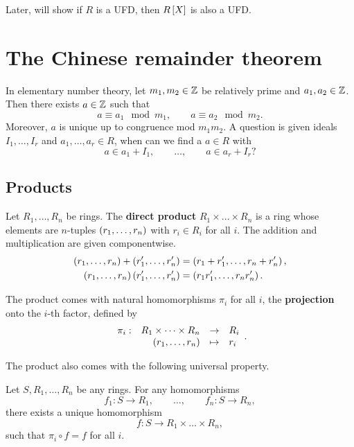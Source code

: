 Later, will show if $ R $ is a UFD, then $ R\sb{X} $ is also a UFD.

\pagebreak

\section{The Chinese remainder theorem}

In elementary number theory, let $ m_1, m_2 \in \Z $ be relatively prime and $ a_1, a_2 \in \Z $. Then there exists $ a \in \Z $ such that
$$ a \equiv a_1 \mod m_1, \qquad a \equiv a_2 \mod m_2. $$
Moreover, $ a $ is unique up to congruence mod $ m_1m_2 $. A question is given ideals $ I_1, \dots, I_r $ and $ a_1, \dots, a_r \in R $, when can we find a $ a \in R $ with
$$ a \in a_1 + I_1, \qquad \dots, \qquad a \in a_r + I_r? $$

\subsection{Products}

\begin{definition}
Let $ R_1, \dots, R_n $ be rings. The \textbf{direct product} $ R_1 \times \dots \times R_n $ is a ring whose elements are $ n $-tuples $ \rb{r_1, \dots, r_n} $ with $ r_i \in R_i $ for all $ i $. The addition and multiplication are given componentwise.
\begin{align*}
\rb{r_1, \dots, r_n} + \rb{r_1', \dots, r_n'} & = \rb{r_1 + r_1', \dots, r_n + r_n'}, \\
\rb{r_1, \dots, r_n}\rb{r_1', \dots, r_n'} & = \rb{r_1r_1', \dots, r_nr_n'}.
\end{align*}
\end{definition}

\begin{note*}
The product comes with natural homomorphisms $ \pi_i $ for all $ i $, the \textbf{projection} onto the $ i $-th factor, defined by
$$ \function[\pi_i]{R_1 \times \dots \times R_n}{R_i}{\rb{r_1, \dots, r_n}}{r_i}. $$
\end{note*}

The product also comes with the following universal property.

\begin{theorem}
Let $ S, R_1, \dots, R_n $ be any rings. For any homomorphisms
$$ f_1 : S \to R_1, \qquad \dots, \qquad f_n : S \to R_n, $$
there exists a unique homomorphism
$$ f : S \to R_1 \times \dots \times R_n, $$
such that $ \pi_i \circ f = f $ for all $ i $.
\end{theorem}


